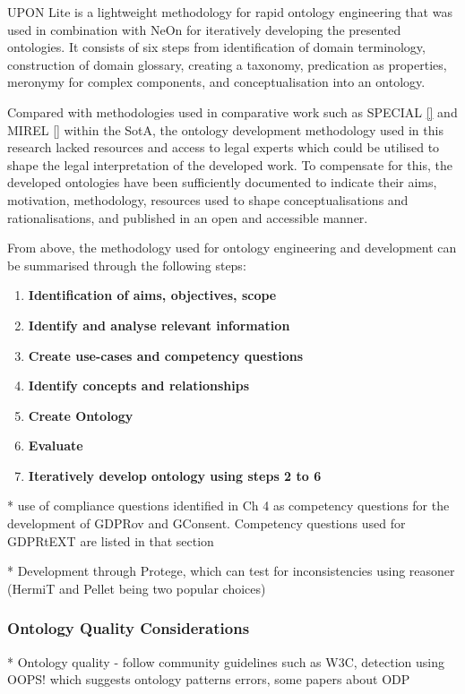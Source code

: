 UPON Lite \cite{} is a lightweight methodology for rapid ontology engineering that was used in combination with NeOn for iteratively developing the presented ontologies. It consists of six steps from identification of domain terminology, construction of domain glossary, creating a taxonomy, predication as properties, meronymy for complex components, and conceptualisation into an ontology.

Compared with methodologies used in comparative work such as SPECIAL \autoref{} and MIREL \autoref{} within the SotA, the ontology development methodology used in this research lacked resources and access to legal experts which could be utilised to shape the legal interpretation of the developed work. To compensate for this, the developed ontologies have been sufficiently documented to indicate their aims, motivation, methodology, resources used to shape conceptualisations and rationalisations, and published in an open and accessible manner.

From above, the methodology used for ontology engineering and development can be summarised through the following steps:
\begin{enumerate}
    \item \textbf{Identification of aims, objectives, scope}
    \item \textbf{Identify and analyse relevant information}
    \item \textbf{Create use-cases and competency questions}
    \item \textbf{Identify concepts and relationships}
    \item \textbf{Create Ontology}
    \item \textbf{Evaluate}
    \item \textbf{Iteratively develop ontology using steps 2 to 6}
\end{enumerate}

* use of compliance questions identified in Ch 4 as competency questions for the development of GDPRov and GConsent. Competency questions used for GDPRtEXT are listed in that section

* Development through Protege, which can test for inconsistencies using reasoner (HermiT and Pellet being two popular choices)

\subsubsection*{Ontology Quality Considerations}
* Ontology quality - follow community guidelines such as W3C, detection using OOPS! which suggests ontology patterns errors, some papers about ODP

